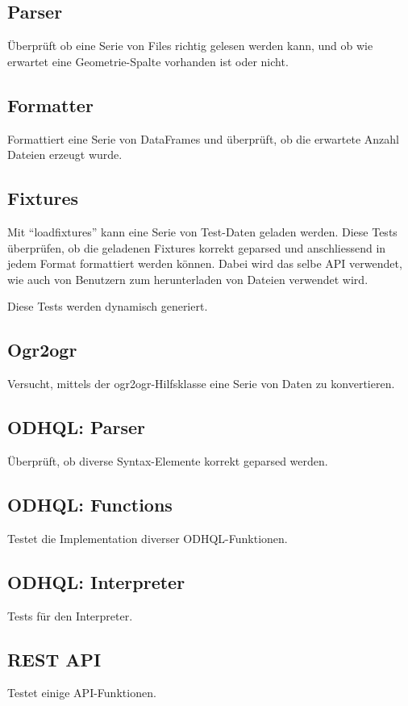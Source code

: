 \subsection{Parser}
Überprüft ob eine Serie von Files richtig gelesen werden kann, und ob wie erwartet eine Geometrie-Spalte vorhanden ist oder nicht.

\subsection{Formatter}
Formattiert eine Serie von DataFrames und überprüft, ob die erwartete Anzahl Dateien erzeugt wurde.

\subsection{Fixtures}
Mit ``loadfixtures'' kann eine Serie von Test-Daten geladen werden. Diese Tests überprüfen, ob die geladenen Fixtures korrekt geparsed und anschliessend in jedem Format formattiert werden können. Dabei wird das selbe API verwendet, wie auch von Benutzern zum herunterladen von Dateien verwendet wird.

Diese Tests werden dynamisch generiert.

\subsection{Ogr2ogr}
Versucht, mittels der ogr2ogr-Hilfsklasse eine Serie von Daten zu konvertieren.

\subsection{ODHQL: Parser}
Überprüft, ob diverse Syntax-Elemente korrekt geparsed werden.

\subsection{ODHQL: Functions}
Testet die Implementation diverser ODHQL-Funktionen.

\subsection{ODHQL: Interpreter}
Tests für den Interpreter.

\subsection{REST API}
Testet einige API-Funktionen.